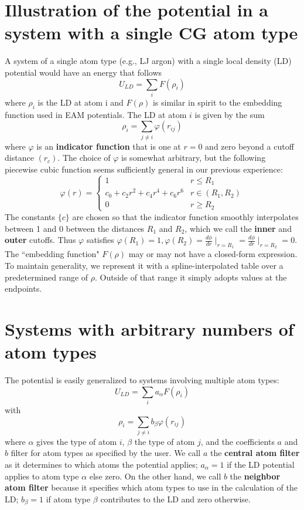 \documentclass[12pt,a4paper]{article}
\begin{document}
\section*{Illustration of the potential in a system with a single CG atom type}
A system of a single atom type (e.g., LJ argon) with a single local density (LD) potential would have an energy that follows
%
\begin{equation*}
U_{LD} = \sum_i F(\rho_i)
\end{equation*}
%
where $\rho_i$ is the LD at atom i and $F(\rho)$ is similar in spirit to the embedding function used in EAM potentials. The LD at atom $i$ is given by the sum
%
\begin{equation*}
\rho_i = \sum_{j \neq i} \varphi(r_{ij})
\end{equation*}
%
where $\varphi$ is an \textbf{indicator function} that is one at $r=0$ and zero beyond a cutoff distance $(r_c)$. The choice of $\varphi$ is somewhat arbitrary, but the following piecewise cubic function seems sufficiently general in our previous experience:\cite{sanyal_2016, sanyal_2018, rosenberger_2019}
%
\begin{equation*}
\varphi(r) = \begin{cases} 
      1 & r \le R_1\\
      c_0 + c_2r^2 + c_4r^4 + c_6r^6  & r \in (R_1, R_2)\\
      0 & r \ge R_2
   \end{cases}
\end{equation*}
%
The constants $\{c\}$ are chosen so that the indicator function smoothly interpolates between 1 and 0 between the distances $R_1$ and $R_2$, which we call the \textbf{inner} and \textbf{outer} cutoffs. Thus $\varphi$ satisfies $\varphi(R_1) = 1, \varphi(R_2) = \frac{d\phi}{dr} \mid_{r=R_1} = \frac{d\phi}{dr} \mid_{r=R_2} = 0$. The ``embedding function" $F(\rho)$ may or may not have a closed-form expression. To maintain generality, we represent it with a spline-interpolated table over a predetermined range of $\rho$. Outside of that range it simply adopts values at the endpoints.
%
%
%
\section*{Systems with arbitrary numbers of atom types}
The potential is easily generalized to systems involving multiple atom types:
%
\begin{equation*}
U_{LD} = \sum_i a_\alpha F(\rho_i)
\end{equation*}
%
with
%
\begin{equation*}
\rho_i = \sum_{j \neq i} b_\beta \varphi(r_{ij})
\end{equation*}
%
where $\alpha$ gives the type of atom $i$, $\beta$ the type of atom $j$, and the coefficients $a$ and $b$ filter for atom types as specified by the user. We call $a$ the \textbf{central atom filter} as it determines to which atoms the potential applies; $a_\alpha = 1$ if the LD potential applies to atom type $\alpha$ else zero. On the other hand, we call $b$ the \textbf{neighbor atom filter} because it specifies which atom types to use in the calculation of the LD; $b_\beta = 1$ if atom type $\beta$ contributes to the LD and zero otherwise.\\
\end{document}
